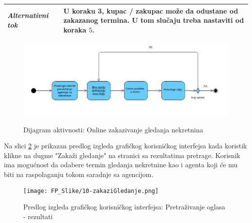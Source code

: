 \documentclass[20pt]{article}
\begin{document}
\begin{center}
\begin{longtable}{p{0.23\linewidth} p{0.77\linewidth}}
 {\it \bfseries Alternativni tok} & U koraku 3, kupac / zakupac mo\v ze da odustane od zakazanog termina. U tom slu\v caju treba nastaviti od koraka $5$.\\
 \hline
 
\end{longtable}
\end{center}

\begin{figure}[h]
        \centering
        \includegraphics[width=1.1\textwidth,height=0.35\textheight] {Pictures/DijagramAktivnostiOnlineZakazivanjeGledanja.png}\\
        \caption{Dijagram aktivnosti: Online zakazivanje gledanja nekretnina}
        \label{fig:dijagramAktivnostiOnlineZakazivanjeGledanja}
    \end{figure}

Na slici \ref{fig:guiZakaziGledanje} je prikazan predlog izgleda grafi\v ckog korisni\v ckog interfejsa kada koristik klikne na dugme "Zaka\v zi gledanje" na stranici sa rezultatima pretrage. Korisnik ima mogu\' cnost da odabere termin gledanja nekretnine kao i agenta koji \' ce mu biti na raspolaganju tokom saradnje sa agencijom.

\begin{figure}[h]
        \centering
        \texttt{[image: FP\_Slike/10-zakaziGledanje.png]}\\
        \caption{Predlog izgleda grafi\v ckog korisni\v ckog interfejsa: Pretra\v zivanje oglasa - rezultati}
        \label{fig:guiZakaziGledanje}
    \end{figure}

\newpage
{}
\setlength{\parindent}{1cm}
\fontsize{13}{18} \selectfont 
\end{document}
